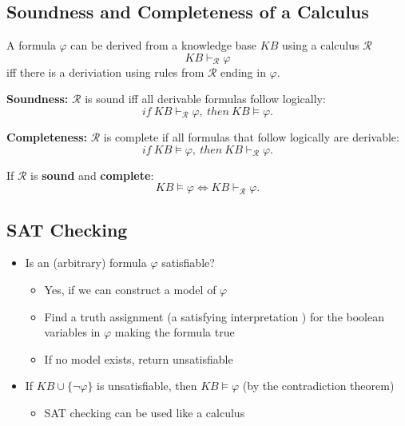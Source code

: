 \documentclass[conference]{styles/acmsiggraph}
\begin{document}
    
    \subsection{Soundness and Completeness of a Calculus}
        A formula $\varphi$ can be derived from a knowledge base $KB$ using a calculus $\mathcal{R}$
            $$KB \vdash_{\mathcal{R}} \varphi$$
        iff there is a deriviation using rules from $\mathcal{R}$ ending in $\varphi$.\newline
        
        \textbf{Soundness:} $\mathcal{R}$ is sound iff all derivable formulas follow logically:
            $$if \  KB \vdash_{\mathcal{R}} \varphi, \  then \  KB \vDash \varphi.$$
        
        \textbf{Completeness:} $\mathcal{R}$ is complete if all formulas that follow logically are derivable:
            $$if \  KB \vDash \varphi, \  then \  KB \vdash_{\mathcal{R}} \varphi.$$
        
        If $\mathcal{R}$ is \textbf{sound} and \textbf{complete}:
            $$KB \vDash \varphi \Leftrightarrow KB \vdash_{\mathcal{R}} \varphi.$$
    


    
    
    
    
    
    
    
    \subsection{SAT Checking}
        \begin{itemize}
            \item Is an (arbitrary) formula $\varphi$ satisfiable?
                \begin{itemize}
                    \item Yes, if we can construct a model of $\varphi$
                    \item Find a truth assignment (a satisfying interpretation ) for the boolean variables in $\varphi$ making the formula true
                    \item If no model exists, return unsatisfiable
                \end{itemize}
            \item If $KB \cup \{ \lnot \varphi \}$ is unsatisfiable, then $KB \vDash \varphi$ (by the contradiction theorem)
                \begin{itemize}
                    \item SAT checking can be used like a calculus
                \end{itemize}
        \end{itemize}
    
\end{document}
